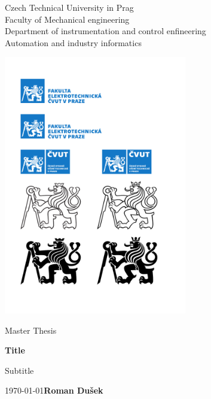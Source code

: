 \documentclass[a4paper, twoside]{article}
\begin{document}
\begin{titlepage}
    \begin{center}
        \vspace*{1cm}
        
        \LARGE
        Czech Technical University in Prag\\[0.1cm]
       	Faculty of Mechanical engineering\\[0.4cm]
		\Large
        Department of instrumentation and control enfineering\\[0.25cm]
        \large
        Automation and industry informatics\\

		\vfill
            
        \includegraphics[width=0.6\textwidth]{lion_white}
                    
        \vfill
        \Large
        Master Thesis

        \vspace{0.8cm}           

        \Huge
        \textbf{Title}
            
        \vspace{0.5cm}
        \LARGE
        Subtitle
        \vspace{3cm}

        \today \hfill \textbf{Roman Dušek}
    \end{center}
\end{titlepage}
\newpage
\tableofcontents
\newpage
\end{document}
